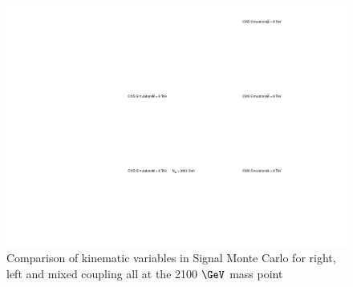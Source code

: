 \begin{figure}[Htcb]
\centering
\includegraphics[width=1.0\textwidth]{AN-13-004/figs/CutCompqcdandsignalGencoupling.pdf}
\caption{Comparison of kinematic variables in Signal Monte Carlo for right, left and mixed coupling all at the 2100$~\GeV$ mass point }
\label{figs:genkin}
\end{figure}






